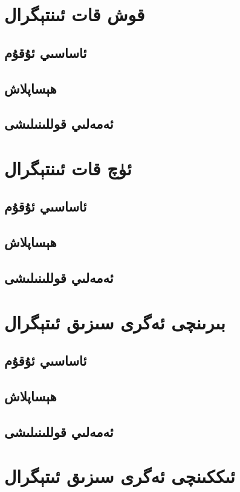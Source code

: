 
\section{قوش قات ئىنتېگرال}
\subsection{ئاساسىي ئۇقۇم}
\subsection{ھېساپلاش}
\subsection{ئەمەلىي قوللىنىلىشى}

\section{ئۈچ قات ئىنتېگرال}
\subsection{ئاساسىي ئۇقۇم}
\subsection{ھېساپلاش}
\subsection{ئەمەلىي قوللىنىلىشى}

\section{بىرىنچى ئەگرى سىزىق ئىتېگرال}
\subsection{ئاساسىي ئۇقۇم}
\subsection{ھېساپلاش}
\subsection{ئەمەلىي قوللىنىلىشى}

\section{ئىككىنچى ئەگرى سىزىق ئىتېگرال}
